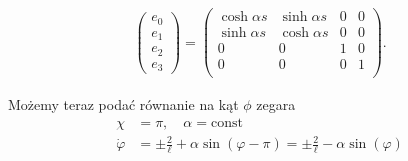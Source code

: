 \begin{align}\label{EHiper}
\begin{pmatrix}
e_0\\
e_1\\
e_2\\
e_3
\end{pmatrix}
=
\begin{pmatrix}
\cosh \alpha s & \sinh \alpha s & 0 &   0 \\
\sinh \alpha s & \cosh \alpha s & 0 &   0 \\
0 & 0 & 1 &   0 \\
0 & 0 & 0 &   1 \\
\end{pmatrix}.
\end{align}

Możemy teraz podać równanie na kąt $\phi$ zegara 
\begin{align*}
\chi &= \pi, \quad \alpha = \text{const} \\
\dot{\varphi} &= \pm \frac{2}{\ell} + \alpha \sin ( \varphi - \pi )
 = \pm \frac{2}{\ell} -  \alpha \sin ( \varphi )
\end{align*}
